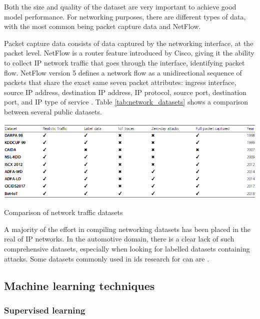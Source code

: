Both the size and quality of the dataset are very important to achieve good model performance. For networking purposes, there are different types of data, with the most common being packet capture data and NetFlow.\par

Packet capture data consists of data captured by the networking interface, at the packet level. NetFlow is a router feature introduced by Cisco, giving it the ability to collect IP network traffic that goes through the interface, identifying packet flow. NetFlow version 5 defines a network flow as a unidirectional sequence of packets that share the exact same seven packet attributes: ingress interface, source IP address, destination IP address, IP protocol, source port, destination port, and IP type of service \citep{Handelman2019}. Table \ref{tab:network_datasets} shows a comparison between several public datasets.

\begin{table}
    \centering
    \includegraphics[width = \textwidth]{img/parts/introduction/Network Datasets.png}
    \caption{Comparison of network traffic datasets \citep{Khraisat2019}}
    \label{tab:network_datasets}
\end{table}

A majority of the effort in compiling networking datasets has been placed in the real of IP networks. In the automotive domain, there is a clear lack of such comprehensive datasets, especially when looking for labelled datasets containing attacks. Some datasets commonly used in \gls{ids} research for \gls{can} are \cite{CANDataset_OTIDS, CANDataset_Car-Hacking, CANDataset_TUE, CANDataset_IEEE}.

\subsection{Machine learning techniques}
\label{subsec:machine_learning_techniques}

\subsubsection{Supervised learning}

